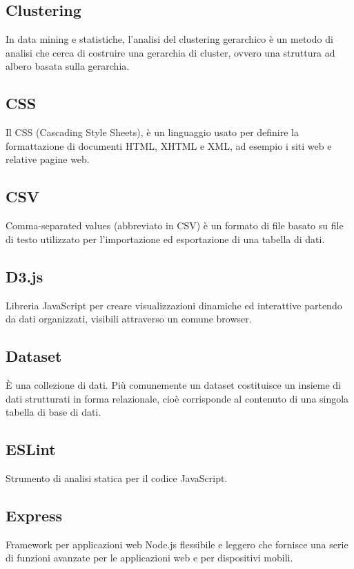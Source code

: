 \documentclass[../manuale_sviluppatore.tex]{subfiles}
\begin{document}
\subsection*{Clustering}
{}
In data mining e statistiche, l'analisi del clustering gerarchico è un metodo di analisi che cerca di costruire una gerarchia di cluster, ovvero una struttura ad albero basata sulla gerarchia.

\subsection*{CSS}
{}
Il CSS (Cascading Style Sheets), è un linguaggio usato per definire la formattazione di documenti HTML, XHTML e XML, ad esempio i siti web e relative pagine web.

\subsection*{CSV}
{}
Comma-separated values (abbreviato in CSV) è un formato di file basato su file di testo utilizzato per l'importazione ed esportazione di una tabella di dati.

\subsection*{D3.js}
{}
Libreria JavaScript per creare visualizzazioni dinamiche ed interattive partendo da dati organizzati, visibili attraverso un comune browser.

\subsection*{Dataset}
{}
È una collezione di dati. Più comunemente un dataset costituisce un insieme di dati strutturati in forma relazionale, cioè corrisponde al contenuto di una singola tabella di base di dati.

\subsection*{ESLint}
{}
Strumento di analisi statica per il codice JavaScript.

\subsection*{Express}
{}
Framework per applicazioni web Node.js flessibile e leggero che fornisce una serie di funzioni avanzate per le applicazioni web e per dispositivi mobili.
\end{document}
